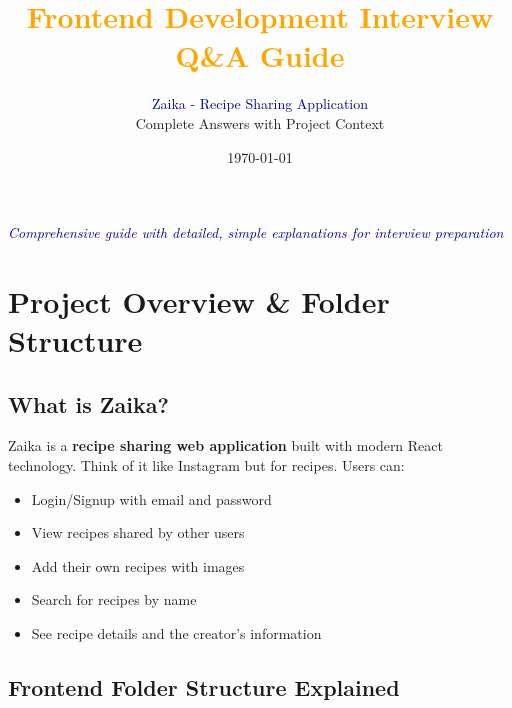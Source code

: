 \documentclass[12pt]{article}
\title{\textcolor{orange}{\textbf{Frontend Development Interview Q\&A Guide}}}
\author{\textcolor{darkblue}{Zaika - Recipe Sharing Application} \\ Complete Answers with Project Context}
\date{\today}
\begin{document}
\maketitle

\begin{center}
\textcolor{darkblue}{\textit{Comprehensive guide with detailed, simple explanations for interview preparation}}
\end{center}

\tableofcontents
\newpage

\section{Project Overview \& Folder Structure}

\subsection{What is Zaika?}

Zaika is a \textbf{recipe sharing web application} built with modern React technology. Think of it like Instagram but for recipes. Users can:
\begin{itemize}
    \item Login/Signup with email and password
    \item View recipes shared by other users
    \item Add their own recipes with images
    \item Search for recipes by name
    \item See recipe details and the creator's information
\end{itemize}

\subsection{Frontend Folder Structure Explained}
\end{document}
